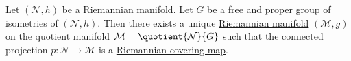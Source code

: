 \begin{proposition}
	Let \((\mathcal{N}, h )\) be a \hyperref[def:Riemannian-manifold]{Riemannian manifold}. Let \(G\) be a free and proper group of isometries of \((\mathcal{N} , h)\). Then there exists a unique \hyperref[def:Riemannian-manifold]{Riemannian manifold} \((\mathcal{M} ,g)\) on the quotient manifold \(\mathcal{M} = \quotient{\mathcal{N} }{G} \) such that the connected projection \(p\colon \mathcal{N}  \to  \mathcal{M} \) is a \hyperref[def:Riemannian-covering-map]{Riemannian covering map}.
\end{proposition}